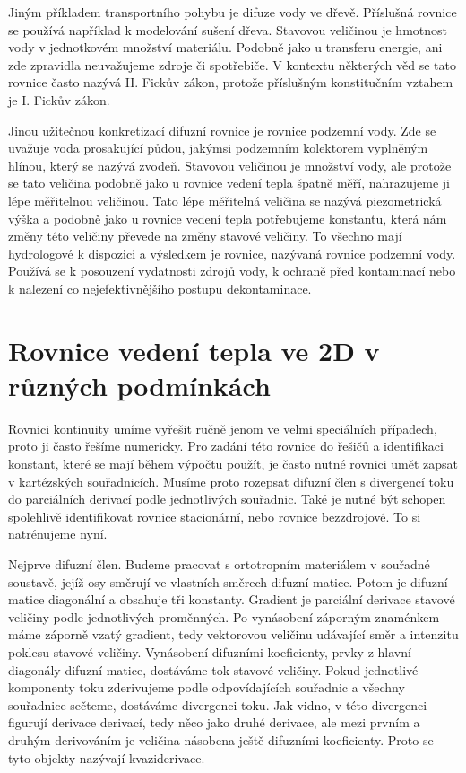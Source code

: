 \documentclass[12pt]{article}
\begin{document}
Jiným příkladem transportního pohybu je difuze vody ve dřevě. Příslušná rovnice se používá například k modelování sušení dřeva. Stavovou veličinou je hmotnost vody v jednotkovém množství materiálu. Podobně jako u transferu energie, ani zde zpravidla neuvažujeme zdroje či spotřebiče. V kontextu některých věd se tato rovnice často nazývá II. Fickův zákon, protože příslušným konstitučním vztahem je I. Fickův zákon.

Jinou užitečnou konkretizací difuzní rovnice je rovnice podzemní vody. Zde se uvažuje voda prosakující půdou, jakýmsi podzemním kolektorem vyplněným hlínou, který se nazývá zvodeň. Stavovou veličinou je množství vody, ale protože se tato veličina podobně jako u rovnice vedení tepla špatně měří, nahrazujeme ji lépe měřitelnou veličinou. Tato lépe měřitelná veličina se nazývá piezometrická výška a podobně jako u rovnice vedení tepla potřebujeme konstantu, která nám změny této veličiny převede na změny stavové veličiny. To všechno mají hydrologové k dispozici a výsledkem je rovnice, nazývaná rovnice podzemní vody. Používá se k posouzení vydatnosti zdrojů vody, k ochraně před kontaminací nebo k nalezení co nejefektivnějšího postupu dekontaminace. 

\section{Rovnice vedení tepla ve 2D v různých podmínkách}

Rovnici kontinuity umíme vyřešit ručně jenom ve velmi speciálních případech, proto ji často řešíme numericky. Pro zadání této rovnice do řešičů a identifikaci konstant, které se mají během výpočtu použít, je často nutné rovnici umět zapsat v kartézských souřadnicích. Musíme proto rozepsat difuzní člen s divergencí toku do parciálních derivací podle jednotlivých souřadnic. Také je nutné být schopen spolehlivě identifikovat rovnice stacionární, nebo rovnice bezzdrojové. To si natrénujeme nyní. 

Nejprve difuzní člen. Budeme pracovat s ortotropním materiálem v souřadné soustavě, jejíž osy směrují ve vlastních směrech difuzní matice.  Potom je difuzní matice diagonální a obsahuje tři konstanty. Gradient je parciální derivace stavové veličiny podle jednotlivých proměnných. Po vynásobení záporným znaménkem máme záporně vzatý gradient, tedy vektorovou veličinu udávající směr a intenzitu poklesu stavové veličiny. Vynásobení difuzními koeficienty, prvky z hlavní diagonály difuzní matice, dostáváme tok stavové veličiny. Pokud jednotlivé komponenty toku zderivujeme podle odpovídajících souřadnic a všechny souřadnice sečteme, dostáváme divergenci toku. Jak vidno, v této divergenci figurují derivace derivací, tedy něco jako druhé derivace, ale mezi prvním a druhým derivováním je veličina násobena ještě difuzními koeficienty. Proto se tyto objekty nazývají kvaziderivace. 
\end{document}

